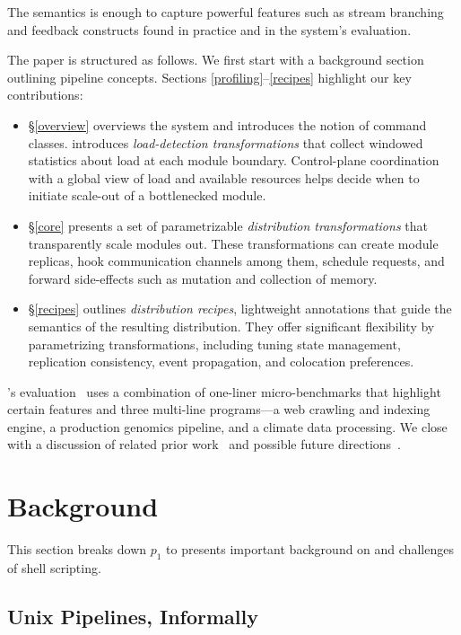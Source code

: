 \documentclass[sigplan,10pt,review,anonymous]{acmart}
\newcommand{\eat}[1]{}
\begin{document}
The semantics is enough to capture powerful features such as stream branching and feedback constructs found in practice and in the system's evaluation.


The paper is structured as follows.
We first start with a background section outlining pipeline concepts.
Sections \ref{profiling}--\ref{recipes} highlight our key contributions:
\begin{itemize}

  \item
  \S\ref{overview} overviews the system and introduces the notion of command classes.
	introduces \emph{load-detection transformations} that collect windowed statistics about load at each module boundary.
  Control-plane coordination with a global view of load and available resources helps decide when to initiate scale-out of a bottlenecked module.

  \item
  \S\ref{core} presents a set of parametrizable \emph{distribution transformations} that transparently scale modules out.
  These transformations can create module replicas, hook communication channels among them, schedule requests, and forward side-effects such as mutation and collection of memory.

  \item
  \S\ref{recipes} outlines \emph{distribution recipes}, lightweight annotations that guide the semantics of the resulting distribution.
  They offer significant flexibility by\eat{ generating configurations that} parametrizing transformations, including tuning state management, replication consistency, event propagation, and colocation preferences.
\end{itemize}

\noindent
\sys's evaluation~ uses a combination of one-liner micro-benchmarks that highlight certain features and three multi-line programs---a web crawling and indexing engine, a production genomics pipeline, and a climate data processing.
We close with a discussion of related prior work~ and possible future directions~.

\section{Background}
\label{bg}

This section breaks down $p_1$ to presents important background on and challenges
of shell scripting.

\subsection{Unix Pipelines, Informally}
\label{bg:pipelines}
\end{document}
